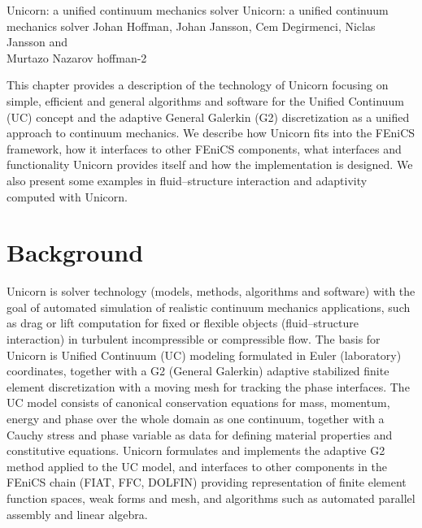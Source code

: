               {Unicorn: a unified continuum mechanics solver}
              {Unicorn: a unified continuum mechanics solver}
              {Johan Hoffman, Johan Jansson, Cem Degirmenci,
                Niclas Jansson and \\ Murtazo Nazarov}
              {hoffman-2}

This chapter provides a description of the technology of Unicorn
focusing on simple, efficient and general algorithms and software for
the Unified Continuum (UC) concept and the adaptive General Galerkin
(G2) discretization as a unified approach to continuum mechanics. We
describe how Unicorn fits into the FEniCS framework, how it interfaces
to other FEniCS components, what interfaces and functionality Unicorn
provides itself and how the implementation is designed. We also
present some examples in fluid--structure interaction and adaptivity
computed with Unicorn.


\section{Background}

Unicorn is solver technology (models, methods, algorithms and
software) with the goal of automated simulation of realistic continuum
mechanics applications, such as drag or lift computation for fixed or
flexible objects (fluid--structure interaction) in turbulent
incompressible or compressible flow. The basis for Unicorn is Unified
Continuum (UC) modeling \citep{HoffmanJanssonStockli2011} formulated
in Euler (laboratory) coordinates, together with a G2 (General
Galerkin) adaptive stabilized finite element discretization with a
moving mesh for tracking the phase interfaces. The UC model consists
of canonical conservation equations for mass, momentum, energy and
phase over the whole domain as one continuum, together with a Cauchy
stress and phase variable as data for defining material properties and
constitutive equations. Unicorn formulates and implements the adaptive
G2 method applied to the UC model, and interfaces to other components
in the FEniCS chain (FIAT, FFC, DOLFIN) providing representation of
finite element function spaces, weak forms and mesh, and algorithms
such as automated parallel assembly and linear algebra.


